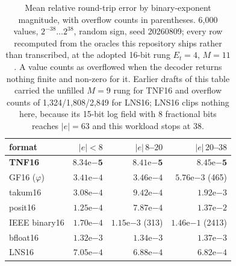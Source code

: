 \documentclass[11pt]{article}
\theoremstyle{definition}
\begin{document}
\begin{table}[t]\centering
\caption{Mean relative round-trip error by binary-exponent magnitude, with
overflow counts in parentheses. 6{,}000 values, $2^{-38}\ldots2^{38}$, random
sign, seed 20260809; every row recomputed from the oracles this repository ships
rather than transcribed, at the adopted 16-bit rung $E_t{=}4$, $M{=}11$. A value
counts as overflowed when the decoder returns nothing finite and non-zero for it.
Earlier drafts of this table carried the unfilled $M{=}9$ rung for TNF16 and
overflow counts of 1{,}324/1{,}808/2{,}849 for LNS16; LNS16 clips nothing here,
because its 15-bit log field with 8 fractional bits reaches $|e|=63$ and this
workload stops at 38.}
\label{tab:field}
\begin{tabular}{lrrr}
\toprule
format & $|e|<8$ & $|e|\,8$--$20$ & $|e|\,20$--$38$ \\
\midrule
\textbf{TNF16}    & $\mathbf{8.34\mathrm{e}{-5}}$ & $\mathbf{8.41\mathrm{e}{-5}}$ & $\mathbf{8.45\mathrm{e}{-5}}$ \\
GF16 ($\varphi$)   & $3.41\mathrm{e}{-4}$ & $3.46\mathrm{e}{-4}$ & $5.76\mathrm{e}{-3}$ (465) \\
takum16            & $3.08\mathrm{e}{-4}$ & $9.42\mathrm{e}{-4}$ & $1.92\mathrm{e}{-3}$ \\
posit16            & $1.25\mathrm{e}{-4}$ & $7.87\mathrm{e}{-4}$ & $1.37\mathrm{e}{-2}$ \\
IEEE binary16      & $1.70\mathrm{e}{-4}$ & $1.15\mathrm{e}{-3}$ (313) & $1.46\mathrm{e}{-1}$ (2413) \\
bfloat16           & $1.32\mathrm{e}{-3}$ & $1.34\mathrm{e}{-3}$ & $1.37\mathrm{e}{-3}$ \\
LNS16              & $7.05\mathrm{e}{-4}$ & $6.88\mathrm{e}{-4}$ & $6.82\mathrm{e}{-4}$ \\
\bottomrule
\end{tabular}
\end{table}
\end{document}

